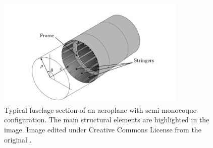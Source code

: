 \begin{figure}
	\centering
	\includegraphics[width=0.8\textwidth]{Figures/semimonocoque.png}
	\caption{Typical fuselage section of an aeroplane with semi-monocoque configuration. The main structural elements are highlighted in the image. Image edited under Creative Commons License from the original \cite{Tosaka_Airframe_4_Types}.}
	\label{fig:semimono}
\end{figure}

